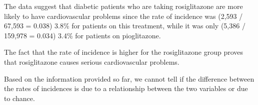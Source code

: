 {\begin{parts}
\item The data suggest that diabetic patients who are taking rosiglitazone are more likely to have cardiovascular problems since the rate of incidence was (2,593 / 67,593 = 0.038) 3.8\% for patients on this treatment, while it was only (5,386 / 159,978 = 0.034) 3.4\% for patients on pioglitazone.
\item The fact that the rate of incidence is higher for the rosiglitazone group proves that rosiglitazone causes serious cardiovascular problems.
\item Based on the information provided so far, we cannot tell if the difference between the rates of incidences is due to a relationship between the two variables or due to chance.
\end{parts}
}{}

\textA{\newpage}


